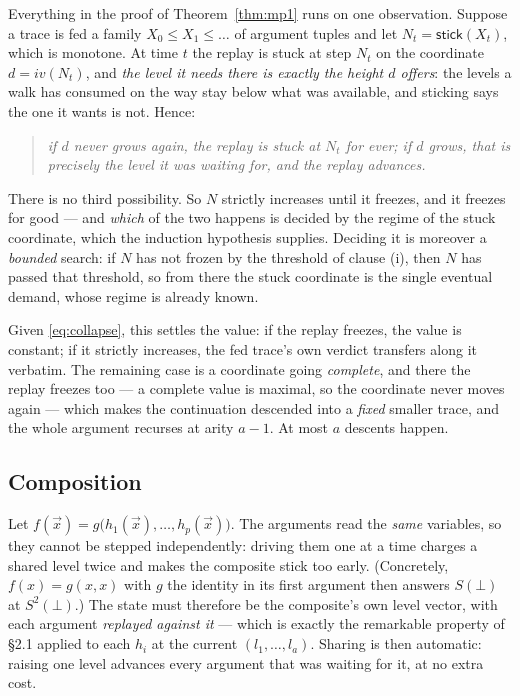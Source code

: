 \documentclass[11pt]{article}
\newcommand{\ivv}{\mathit{iv}}
\newcommand{\stick}{\mathsf{stick}}
\theoremstyle{definition}
\begin{document}
Everything in the proof of Theorem~\ref{thm:mp1} runs on one observation.
Suppose a trace is fed a family $X_0 \le X_1 \le \dots$ of argument tuples
and let $N_t = \stick(X_t)$, which is monotone. At time $t$ the replay is
stuck at step $N_t$ on the coordinate $d = \ivv(N_t)$, and \emph{the level
it needs there is exactly the height $d$ offers}: the levels a walk has
consumed on the way stay below what was available, and sticking says the
one it wants is not. Hence:
\begin{quote}
\emph{if $d$ never grows again, the replay is stuck at $N_t$ for ever; if
$d$ grows, that is precisely the level it was waiting for, and the replay
advances.}
\end{quote}
There is no third possibility. So $N$ strictly increases until it freezes,
and it freezes for good --- and \emph{which} of the two happens is decided
by the regime of the stuck coordinate, which the induction hypothesis
supplies. Deciding it is moreover a \emph{bounded} search: if $N$ has not
frozen by the threshold of clause (i), then $N$ has passed that threshold,
so from there the stuck coordinate is the single eventual demand, whose
regime is already known.

Given \eqref{eq:collapse}, this settles the value: if the replay freezes,
the value is constant; if it strictly increases, the fed trace's own
verdict transfers along it verbatim. The remaining case is a coordinate
going \emph{complete}, and there the replay freezes too --- a complete
value is maximal, so the coordinate never moves again --- which makes the
continuation descended into a \emph{fixed} smaller trace, and the whole
argument recurses at arity $a-1$. At most $a$ descents happen.

\subsection{Composition}

Let $f(\vec x) = g\bigl(h_1(\vec x),\dots,h_p(\vec x)\bigr)$. The
arguments read the \emph{same} variables, so they cannot be stepped
independently: driving them one at a time charges a shared level twice and
makes the composite stick too early. (Concretely, $f(x) = g(x,x)$ with $g$
the identity in its first argument then answers $S(\bot)$ at $S^2(\bot)$.)
The state must therefore be the composite's own level vector, with each
argument \emph{replayed against it} --- which is exactly the remarkable
property of \S2.1 applied to each $h_i$ at the current $(l_1,\dots,l_a)$.
Sharing is then automatic: raising one level advances every argument that
was waiting for it, at no extra cost.
\end{document}
